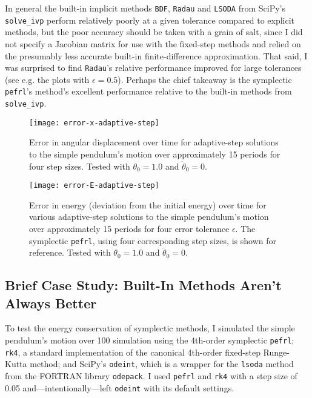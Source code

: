 \documentclass[11pt, a4paper]{article}
\begin{document}
In general the built-in implicit methods \texttt{BDF}, \texttt{Radau} and \texttt{LSODA} from SciPy's \texttt{solve\_ivp} perform relatively poorly at a given tolerance compared to explicit methods, but the poor accuracy should be taken with a grain of salt, since I did not specify a Jacobian matrix for use with the fixed-step methods and relied on the presumably less accurate built-in finite-difference approximation. That said, I was surprised to find \texttt{Radau}'s relative performance improved for large tolerances (see e.g. the plots with $ \epsilon = 0.5 $). Perhaps the chief takeaway is the symplectic \texttt{pefrl}'s method's excellent performance relative to the built-in methods from \texttt{solve\_ivp}.

\begin{figure}[htb!]
\centering
\texttt{[image: error-x-adaptive-step]}

\caption{Error in angular displacement over time for adaptive-step solutions to the simple pendulum's motion over approximately 15 periods for four step sizes. Tested with $ \theta_{0} = 1.0 $ and $ \dot{\theta}_{0} = 0 $.}

\label{newton:fig:error-x-adaptive}
\end{figure}

\begin{figure}[htb!]
\centering
\texttt{[image: error-E-adaptive-step]}

\caption{Error in energy (deviation from the initial energy) over time for various adaptive-step solutions to the simple pendulum's motion over approximately 15 periods for four error tolerance $ \epsilon $. The symplectic \texttt{pefrl}, using four corresponding step sizes, is shown for reference. Tested with $ \theta_{0} = 1.0 $ and $ \dot{\theta}_{0} = 0 $.}

\label{newton:fig:error-E-adaptive}
\end{figure}


\subsection{Brief Case Study: Built-In Methods Aren't Always Better}
To test the energy conservation of symplectic methods, I simulated the simple pendulum's motion over 100 simulation using the 4th-order symplectic \texttt{pefrl}; \texttt{rk4}, a standard implementation of the canonical 4th-order fixed-step Runge-Kutta method; and SciPy's \texttt{odeint}, which is a wrapper for the \texttt{lsoda} method from the FORTRAN library \texttt{odepack}. I used \texttt{pefrl} and \texttt{rk4} with a step size of 0.05 and---intentionally---left \texttt{odeint} with its default settings.
\end{document}
